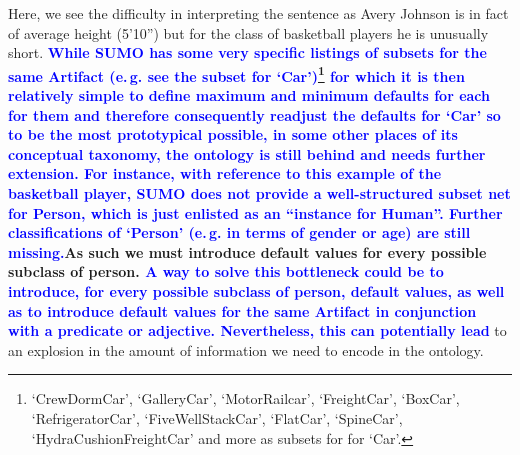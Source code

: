 \documentclass[11pt]{article}
\begin{document}
Here, we see the difficulty in interpreting the sentence as Avery Johnson is in fact of average height (5'10'') but
for the class of basketball players he is unusually short. \textbf{\textcolor{blue}{While SUMO has some very specific listings of subsets for the same Artifact (e.\,g. see the subset for `Car')\footnote{`CrewDormCar', `GalleryCar', `MotorRailcar', `FreightCar', `BoxCar', `RefrigeratorCar', `FiveWellStackCar', `FlatCar', `SpineCar', `HydraCushionFreightCar' and more as subsets for for `Car'.} for which it is then relatively simple to define maximum and minimum defaults for each for them and therefore consequently readjust the defaults for `Car' so to be the most prototypical possible, in some other places of its conceptual taxonomy, the ontology is still behind and needs further extension. For instance, with reference to this example of the basketball player, SUMO does not provide a well-structured subset net for Person, which is just enlisted as an ``instance for Human''. Further classifications of `Person' (e.\,g. in terms of gender or age) are still missing.}}\textbf{As such we must introduce default values for
every possible subclass of person. \textcolor{blue}{A way to solve this bottleneck could be to introduce, for every possible subclass of person, default values, as well as to introduce default values for the same Artifact in conjunction with a predicate or adjective. Nevertheless, this can potentially lead}} to an explosion in the amount of information we
need to encode in the ontology.
\end{document}

